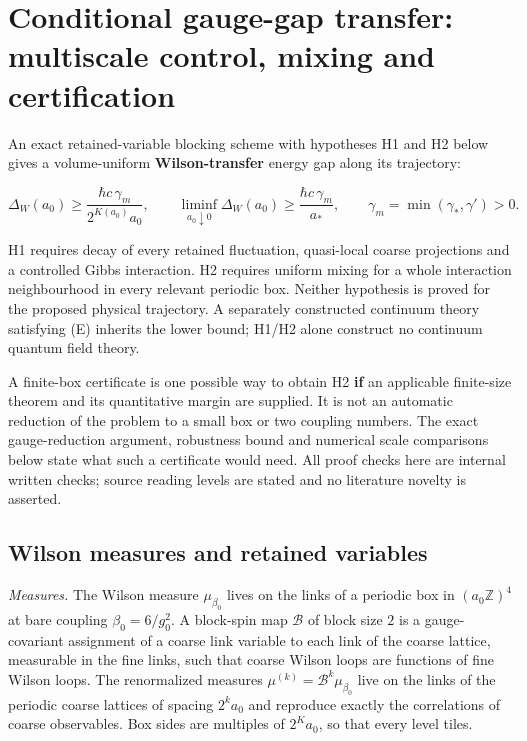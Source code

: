 \documentclass[11pt,a4paper]{article}
\begin{document}
\hypertarget{conditional-gauge-gap-transfer-multiscale-control-mixing-and-certification}{%
\section{Conditional gauge-gap transfer: multiscale control, mixing and
certification}\label{conditional-gauge-gap-transfer-multiscale-control-mixing-and-certification}}

An exact retained-variable blocking scheme with hypotheses H1 and H2
below gives a volume-uniform \textbf{Wilson-transfer} energy gap along
its trajectory:

\[\Delta_W(a_0)\ge\frac{\hbar c\,\gamma_m}{2^{K(a_0)}a_0},\qquad
 \liminf_{a_0\downarrow0}\Delta_W(a_0)
 \ge\frac{\hbar c\,\gamma_m}{a_*},\qquad
 \gamma_m=\min(\gamma_*,\gamma')>0.\]

H1 requires decay of every retained fluctuation, quasi-local coarse
projections and a controlled Gibbs interaction. H2 requires uniform
mixing for a whole interaction neighbourhood in every relevant periodic
box. Neither hypothesis is proved for the proposed physical trajectory.
A separately constructed continuum theory satisfying (E) inherits the
lower bound; H1/H2 alone construct no continuum quantum field theory.

A finite-box certificate is one possible way to obtain H2 \textbf{if} an
applicable finite-size theorem and its quantitative margin are supplied.
It is not an automatic reduction of the problem to a small box or two
coupling numbers. The exact gauge-reduction argument, robustness bound
and numerical scale comparisons below state what such a certificate
would need. All proof checks here are internal written checks; source
reading levels are stated and no literature novelty is asserted.

\hypertarget{wilson-measures-and-retained-variables}{%
\subsection{Wilson measures and retained
variables}\label{wilson-measures-and-retained-variables}}

\emph{Measures.} The Wilson measure \(\mu_{\beta_0}\) lives on the links
of a periodic box in \((a_0\mathbb Z)^4\) at bare coupling
\(\beta_0=6/g_0^2\). A block-spin map \(\mathcal B\) of block size \(2\)
is a gauge-covariant assignment of a coarse link variable to each link
of the coarse lattice, measurable in the fine links, such that coarse
Wilson loops are functions of fine Wilson loops. The renormalized
measures \(\mu^{(k)}=\mathcal B^k\mu_{\beta_0}\) live on the links of
the periodic coarse lattices of spacing \(2^ka_0\) and reproduce exactly
the correlations of coarse observables. Box sides are multiples of
\(2^Ka_0\), so that every level tiles.
\end{document}
